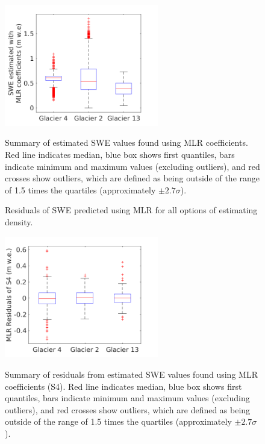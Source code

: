 \documentclass{sfuthesis}
\newcommand{\boxMatlab}{Red line indicates median, blue box shows first quantiles, bars indicate minimum and maximum values (excluding outliers), and red crosses show outliers, which are defined as being outside of the range of 1.5 times the quartiles (approximately $\pm2.7\sigma$). }
\begin{document}
\begin{figure}
\centering
	\includegraphics[width =0.6\textwidth]{ModelledSWE_box_MLR.png}\\
\caption{Summary of estimated SWE values found using MLR coefficients. \boxMatlab}
\label{fig:MLRsweboxplot}
\end{figure} 


\begin{figure}[H]
	\caption{Residuals of SWE predicted using MLR for all options of estimating density.}
	\label{fig:MLRresiduals_all}
\end{figure}

\begin{figure}[H]
\centering
	\includegraphics[width =0.6\textwidth]{residuals_box_MLR.png}\\
\caption{Summary of residuals from estimated SWE values found using MLR coefficients (S4). \boxMatlab}
\label{fig:MLRresidualsboxplot}
\end{figure} 
\end{document}
